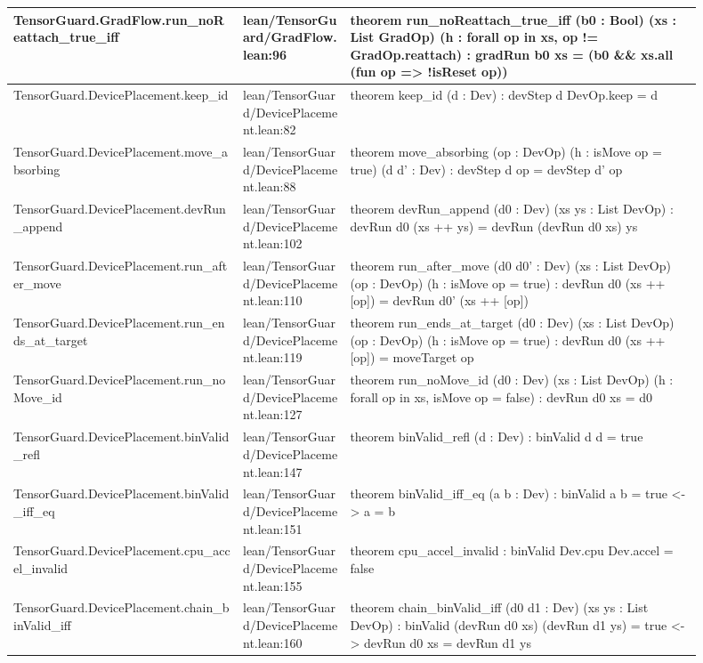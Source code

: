 \documentclass[10pt]{article}
\begin{document}
\begin{longtable}{|p{0.30\linewidth}|p{0.14\linewidth}|p{0.46\linewidth}|}
\hline
TensorGuard.GradFlow.run\_noReattach\_true\_iff & lean/TensorGuard/GradFlow.lean:96 & theorem run\_noReattach\_true\_iff (b0 : Bool) (xs : List GradOp) (h : forall op in xs, op != GradOp.reattach) : gradRun b0 xs = (b0 \&\& xs.all (fun op => !isReset op)) \\
\hline
TensorGuard.DevicePlacement.keep\_id & lean/TensorGuard/DevicePlacement.lean:82 & theorem keep\_id (d : Dev) : devStep d DevOp.keep = d \\
\hline
TensorGuard.DevicePlacement.move\_absorbing & lean/TensorGuard/DevicePlacement.lean:88 & theorem move\_absorbing (op : DevOp) (h : isMove op = true) (d d' : Dev) : devStep d op = devStep d' op \\
\hline
TensorGuard.DevicePlacement.devRun\_append & lean/TensorGuard/DevicePlacement.lean:102 & theorem devRun\_append (d0 : Dev) (xs ys : List DevOp) : devRun d0 (xs ++ ys) = devRun (devRun d0 xs) ys \\
\hline
TensorGuard.DevicePlacement.run\_after\_move & lean/TensorGuard/DevicePlacement.lean:110 & theorem run\_after\_move (d0 d0' : Dev) (xs : List DevOp) (op : DevOp) (h : isMove op = true) : devRun d0 (xs ++ [op]) = devRun d0' (xs ++ [op]) \\
\hline
TensorGuard.DevicePlacement.run\_ends\_at\_target & lean/TensorGuard/DevicePlacement.lean:119 & theorem run\_ends\_at\_target (d0 : Dev) (xs : List DevOp) (op : DevOp) (h : isMove op = true) : devRun d0 (xs ++ [op]) = moveTarget op \\
\hline
TensorGuard.DevicePlacement.run\_noMove\_id & lean/TensorGuard/DevicePlacement.lean:127 & theorem run\_noMove\_id (d0 : Dev) (xs : List DevOp) (h : forall op in xs, isMove op = false) : devRun d0 xs = d0 \\
\hline
TensorGuard.DevicePlacement.binValid\_refl & lean/TensorGuard/DevicePlacement.lean:147 & theorem binValid\_refl (d : Dev) : binValid d d = true \\
\hline
TensorGuard.DevicePlacement.binValid\_iff\_eq & lean/TensorGuard/DevicePlacement.lean:151 & theorem binValid\_iff\_eq (a b : Dev) : binValid a b = true <-> a = b \\
\hline
TensorGuard.DevicePlacement.cpu\_accel\_invalid & lean/TensorGuard/DevicePlacement.lean:155 & theorem cpu\_accel\_invalid : binValid Dev.cpu Dev.accel = false \\
\hline
TensorGuard.DevicePlacement.chain\_binValid\_iff & lean/TensorGuard/DevicePlacement.lean:160 & theorem chain\_binValid\_iff (d0 d1 : Dev) (xs ys : List DevOp) : binValid (devRun d0 xs) (devRun d1 ys) = true <-> devRun d0 xs = devRun d1 ys \\

\end{longtable}
\end{document}

